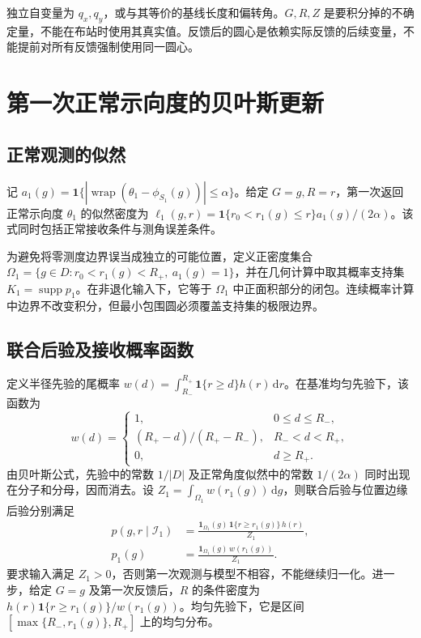\documentclass[UTF8,a4paper,zihao=-4,fontset=none]{ctexart}
\numberwithin{equation}{section}
\theoremstyle{definition}
\newcommand{\ind}{\mathbf 1}
\newcommand{\dd}{\,\mathrm d}
\newcommand{\wrap}{\operatorname{wrap}}
\newcommand{\supp}{\operatorname{supp}}
\begin{document}
独立自变量为 \(q_x,q_y\)，或与其等价的基线长度和偏转角。\(G,R,Z\) 是要积分掉的不确定量，不能在布站时使用其真实值。反馈后的圆心是依赖实际反馈的后续变量，不能提前对所有反馈强制使用同一圆心。

\section{第一次正常示向度的贝叶斯更新}
\subsection{正常观测的似然}
记 \(a_1(g)=\ind\{|\wrap(\theta_1-\phi_{S_1}(g))|\le\alpha\}\)。给定 \(G=g,R=r\)，第一次返回正常示向度 \(\theta_1\) 的似然密度为 \(\ell_1(g,r)=\ind\{r_0<r_1(g)\le r\}a_1(g)/(2\alpha)\)。该式同时包括正常接收条件与测角误差条件。

为避免将零测度边界误当成独立的可能位置，定义正密度集合 \(\Omega_1=\{g\in D:r_0<r_1(g)<R_+,\ a_1(g)=1\}\)，并在几何计算中取其概率支持集 \(K_1=\supp p_1\)。在非退化输入下，它等于 \(\Omega_1\) 中正面积部分的闭包。连续概率计算中边界不改变积分，但最小包围圆必须覆盖支持集的极限边界。

\subsection{联合后验及接收概率函数}
定义半径先验的尾概率 \(w(d)=\int_{R_-}^{R_+}\ind\{r\ge d\}h(r)\dd r\)。在基准均匀先验下，该函数为
\begin{equation}\label{eq:w}
w(d)=
\begin{cases}
1,&0\le d\le R_-,\\
(R_+-d)/(R_+-R_-),&R_-<d<R_+,\\
0,&d\ge R_+.
\end{cases}
\end{equation}
由贝叶斯公式，先验中的常数 \(1/|D|\) 及正常角度似然中的常数 \(1/(2\alpha)\) 同时出现在分子和分母，因而消去。设 \(Z_1=\int_{\Omega_1}w(r_1(g))\dd g\)，则联合后验与位置边缘后验分别满足
\begin{equation}\label{eq:posterior1}
\begin{aligned}
p(g,r\mid\mathcal I_1)
&=\frac{\ind_{\Omega_1}(g)\,\ind\{r\ge r_1(g)\}\,h(r)}{Z_1},\\
p_1(g)&=\frac{\ind_{\Omega_1}(g)\,w(r_1(g))}{Z_1}.
\end{aligned}
\end{equation}
要求输入满足 \(Z_1>0\)，否则第一次观测与模型不相容，不能继续归一化。进一步，给定 \(G=g\) 及第一次反馈后，\(R\) 的条件密度为 \(h(r)\ind\{r\ge r_1(g)\}/w(r_1(g))\)。均匀先验下，它是区间 \([\max\{R_-,r_1(g)\},R_+]\) 上的均匀分布。
\end{document}
